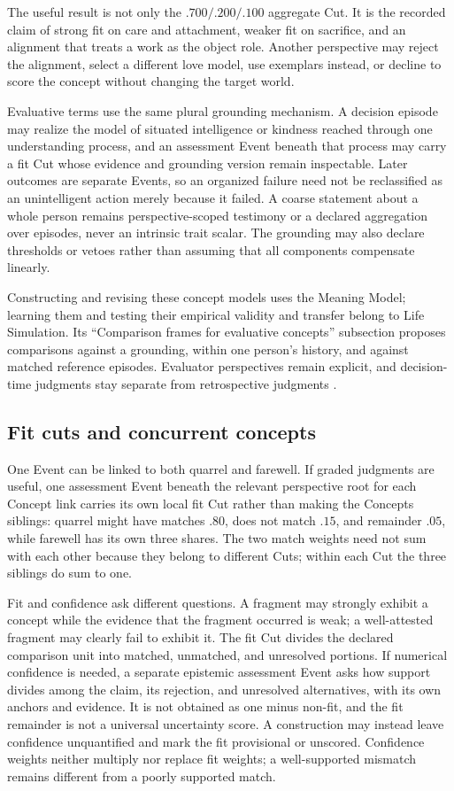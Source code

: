 \documentclass[11pt,a4paper]{article}
\begin{document}
The useful result is not only the $.700/.200/.100$ aggregate Cut. It is the
recorded claim of strong fit on care and attachment, weaker fit on sacrifice,
and an alignment that treats a work as the object role. Another perspective may reject the alignment, select
a different love model, use exemplars instead, or decline to score the concept
without changing the target world.

Evaluative terms use the same plural grounding mechanism. A decision episode
may realize the model of situated intelligence or kindness reached through one
understanding process, and an assessment Event beneath that process may carry a fit Cut whose evidence and
grounding version remain inspectable. Later outcomes are separate Events, so an organized failure need
not be reclassified as an unintelligent action merely because it failed. A
coarse statement about a whole person remains perspective-scoped testimony or a
declared aggregation over episodes, never an intrinsic trait scalar. The grounding
may also declare thresholds or vetoes rather than assuming that all components
compensate linearly.

Constructing and revising these concept models uses the Meaning Model; learning
them and testing their empirical validity and transfer belong to Life
Simulation. Its ``Comparison frames for evaluative concepts'' subsection
proposes comparisons against a grounding, within one person's history, and
against matched reference episodes. Evaluator perspectives remain explicit,
and decision-time judgments stay separate from retrospective judgments
\cite{westerbergLifeSimulation2026}.

\subsection{Fit cuts and concurrent concepts}
\label{sec:fit-cuts}

One Event can be linked to both quarrel and farewell. If graded judgments are
useful, one assessment Event beneath the relevant perspective root for each Concept link carries
its own local fit Cut rather than making the Concepts siblings: quarrel might
have matches $.80$, does not match $.15$, and remainder $.05$, while
farewell has its own three shares. The two
match weights need not sum with each other because they belong to different
Cuts; within each Cut the three siblings do sum to one.

Fit and confidence ask different questions. A fragment may strongly exhibit a
concept while the evidence that the fragment occurred is weak; a well-attested
fragment may clearly fail to exhibit it. The fit Cut divides the declared
comparison unit into matched, unmatched, and unresolved portions. If numerical
confidence is needed, a separate epistemic assessment Event asks how support
divides among the claim, its rejection, and unresolved alternatives, with its
own anchors and evidence. It is not obtained as one minus non-fit, and the fit
remainder is not a universal uncertainty score. A construction may instead
leave confidence unquantified and mark the fit provisional or unscored.
Confidence weights neither multiply nor replace fit weights; a well-supported
mismatch remains different from a poorly supported match.
\end{document}
